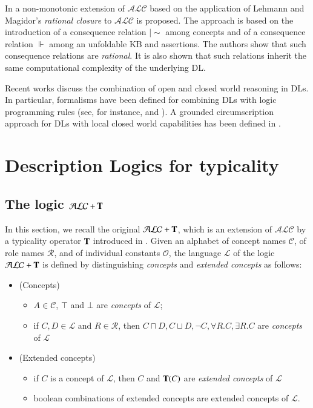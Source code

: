 \documentclass[a4paper, 11pt, oneside]{elsarticle}
\newcommand {\ent} {\mathrel{{\scriptstyle\mid\!\sim}}}
\newcommand{\tip}{{\bf T}}
\newcommand{\alc}{\mathcal{ALC}}
\newcommand{\alct}{\mathcal{ALC}+\tip}
\newcommand{\vero} {\top}
\newcommand{\elle} {\mathcal{L}}
\begin{document}
In \cite{casinistraccia2010,stracciaijcai2011} a non-monotonic extension of $\mathcal{ALC}$  based on the application of Lehmann and Magidor's \emph{rational closure} \cite{whatdoes} to $\mathcal{ALC}$ is proposed. The approach is based on the introduction of a consequence relation $\ent$ among concepts and of a consequence relation $\Vdash$ among an unfoldable KB and assertions. The authors show that such consequence relations are \emph{rational}. It is also shown that such relations inherit the same computational complexity of the underlying DL.

Recent works discuss the combination of open and closed world reasoning in DLs. In particular, formalisms have been defined for combining DLs with logic programming rules (see, for instance, \cite{eiter2004} and \cite{rosatiacm}). A grounded circumscription approach for DLs with local closed world capabilities has been defined in \cite{hitzlerdl}.


\newpage


\section{Description Logics for typicality}

\subsection{The logic $\alct$}\label{alct}


In this section, we recall the original $\alct$, which is an extension of $\alc$ by a typicality operator $\tip$ introduced in \cite{FI09}. Given an alphabet of concept names $\mathcal{C}$, of role names $\mathcal{R}$, and of individual constants $\mathcal{O}$, the language $\elle$ of the logic $\alct$ is defined by distinguishing \emph{concepts} and \emph{extended concepts} as follows:

\begin{itemize}
\item (Concepts)
  \begin{itemize}
     \item $A \in \mathcal{C}$, $\vero$ and $\bot$ are \emph{concepts} of
$\elle$;
    \item if $C, D \in \elle$ and $R \in \mathcal{R}$, then $C
\sqcap D, C \sqcup D, \neg C, \forall R.C, \exists R.C$ are
\emph{concepts} of $\elle$
  \end{itemize}
\item (Extended concepts)
    \begin{itemize}
       \item if $C$ is a
concept of $\elle$, then $C$ and $\tip(C)$ are \emph{extended concepts} of $\elle$
     \item boolean combinations of extended concepts are extended
concepts of $\elle$.
    \end{itemize}
\end{itemize}
\end{document}
